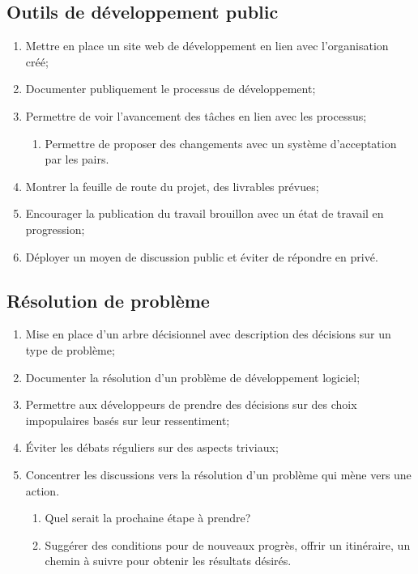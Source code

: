 \subsection{Outils de développement public}

\begin{enumerate}
    \item Mettre en place un site web de développement en lien avec l'organisation créé;
    \item Documenter publiquement le processus de développement;
    \item Permettre de voir l'avancement des tâches en lien avec les processus;
    \begin{enumerate}
        \item Permettre de proposer des changements avec un système d'acceptation par les pairs.
    \end{enumerate}
    \item Montrer la feuille de route du projet, des livrables prévues;
    \item Encourager la publication du travail brouillon avec un état de travail en progression;
    \item Déployer un moyen de discussion public et éviter de répondre en privé.
\end{enumerate}

\subsection{Résolution de problème}

\begin{enumerate}
    \item Mise en place d'un arbre décisionnel avec description des décisions sur un type de problème;
    \item Documenter la résolution d'un problème de développement logiciel;
    \item Permettre aux développeurs de prendre des décisions sur des choix impopulaires basés sur leur ressentiment;
    \item Éviter les débats réguliers sur des aspects triviaux;
    \item Concentrer les discussions vers la résolution d'un problème qui mène vers une action.
    \begin{enumerate}
        \item Quel serait la prochaine étape à prendre?
        \item Suggérer des conditions pour de nouveaux progrès, offrir un itinéraire, un chemin à suivre pour obtenir les résultats désirés.
    \end{enumerate}
\end{enumerate}

